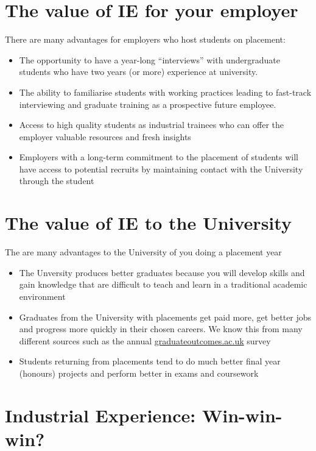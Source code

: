 \documentclass[
]{book}
\providecommand{\tightlist}{%
  \setlength{\itemsep}{0pt}\setlength{\parskip}{0pt}}
\begin{document}
\section{The value of IE for your employer}\label{evalue}

There are many advantages for employers who host students on placement:

\begin{itemize}
\tightlist
\item
  The opportunity to have a year-long ``interviews'' with undergraduate students who have two years (or more) experience at university.
\item
  The ability to familiarise students with working practices leading to fast-track interviewing and graduate training as a prospective future employee.
\item
  Access to high quality students as industrial trainees who can offer the employer valuable resources and fresh insights
\item
  Employers with a long-term commitment to the placement of students will have access to potential recruits by maintaining contact with the University through the student
\end{itemize}

\section{The value of IE to the University}\label{uvalue}

The are many advantages to the University of you doing a placement year

\begin{itemize}
\tightlist
\item
  The Unversity produces better graduates because you will develop skills and gain knowledge that are difficult to teach and learn in a traditional academic environment
\item
  Graduates from the University with placements get paid more, get better jobs and progress more quickly in their chosen careers. We know this from many different sources such as the annual \href{https://www.graduateoutcomes.ac.uk/}{graduateoutcomes.ac.uk} survey \citep{graduateoutcomes}
\item
  Students returning from placements tend to do much better final year (honours) projects and perform better in exams and coursework
\end{itemize}

\section{Industrial Experience: Win-win-win?}\label{win}
\end{document}
